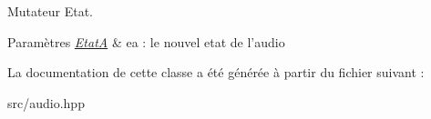 Mutateur Etat. 


\begin{DoxyParams}{Paramètres}
{\em \hyperlink{classEtatA}{Etat\+A}} & ea \+: le nouvel etat de l'audio \\
\hline
\end{DoxyParams}


La documentation de cette classe a été générée à partir du fichier suivant \+:\begin{DoxyCompactItemize}
\item 
src/audio.\+hpp\end{DoxyCompactItemize}
